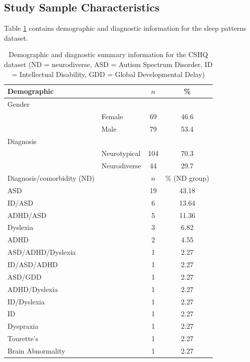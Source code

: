 \documentclass[11pt]{article}
\theoremstyle{plain}
\theoremstyle{definition}
\begin{document}
\subsection{Study Sample Characteristics}
Table \ref{table:demographic_diagnostic_table_CSHQ} contains demographic and diagnostic information for the sleep patterns dataset.
\begin{table}[H]
\centering
\begin{tabular}{llcc}
\toprule
 Demographic & &  $n$ & \% \\
\midrule
 Gender&  & \\
& Female &  69 & 46.6\\
& Male &   79 & 53.4\\
Diagnosis & & \\
& Neurotypical & 104 & 70.3 \\
& Neurodiverse & 44 & 29.7 \\
\bottomrule
Diagnosis/comorbidity (ND) & & $n$ & \% (ND group) \\
\midrule
ASD & & 19 & 43.18 \\
ID/ASD & & 6 & 13.64 \\
ADHD/ASD & & 5 & 11.36 \\
Dyslexia & & 3 & 6.82 \\
ADHD & & 2 & 4.55 \\
ASD/ADHD/Dyslexia & & 1 & 2.27 \\
ID/ASD/ADHD & & 1 & 2.27 \\
ASD/GDD & & 1 & 2.27 \\
ADHD/Dyslexia & & 1 & 2.27 \\
ID/Dyslexia & & 1 & 2.27 \\
ID & & 1 & 2.27 \\
Dyspraxia & & 1 & 2.27 \\
Tourette's & & 1 & 2.27 \\
Brain Abnormality & & 1 & 2.27 \\
\bottomrule
\end{tabular}
\caption{Demographic and diagnostic summary information for the CSHQ dataset (ND = neurodiverse, ASD = Autism Spectrum Disorder, ID = Intellectual Disability, GDD = Global Developmental Delay)}\label{table:demographic_diagnostic_table_CSHQ}
\end{table}
\end{document}
